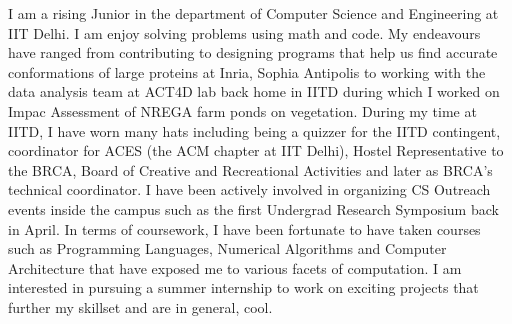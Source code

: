\documentclass{article}
\begin{document}
I am a rising Junior in the department of Computer Science and Engineering at IIT Delhi. I am enjoy solving problems using math and code. My endeavours have ranged from contributing to designing programs that help us find accurate conformations of large proteins at Inria, Sophia Antipolis to working with the data analysis team at ACT4D lab back home in IITD during which I worked on Impac  Assessment of NREGA farm ponds on vegetation. During my time at IITD, I have worn many hats including being a quizzer for the IITD contingent, coordinator for ACES (the ACM chapter at IIT Delhi), Hostel Representative to the BRCA, Board of Creative and Recreational Activities and later as BRCA's technical coordinator. I have been actively involved in organizing CS Outreach events inside the campus such as the first Undergrad Research Symposium back in April. In terms of coursework, I have been fortunate to have taken courses such as Programming Languages, Numerical Algorithms and Computer Architecture that have exposed me to various facets of computation. I am interested in pursuing a summer internship to work on exciting projects that further my skillset and are in general, cool.
\end{document}
